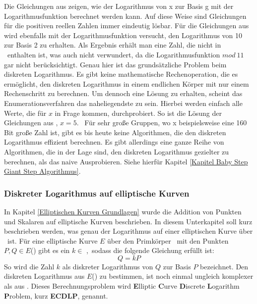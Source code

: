 		Die Gleichungen aus  zeigen, wie der Logarithmus von x zur Basis g mit der Logarithmusfunktion berechnet werden kann. Auf diese Weise sind Gleichungen für die positiven reellen Zahlen  immer eindeutig lösbar. Für die Gleichungen aus  wird ebenfalls mit der Logarithmusfunktion versucht, den Logarithmus von 10 zur Basis 2 zu erhalten. Als Ergebnis erhält man eine Zahl, die nicht in \myZPStern~enthalten ist, was auch nicht verwundert, da die Logarithmusfunktion $mod~11$ gar nicht berücksichtigt. Genau hier ist das grundsätzliche Problem beim diskreten Logarithmus. Es gibt keine mathematische Rechenoperation, die es ermöglicht, den diskreten Logarithmus in einem endlichen Körper mit nur einem Rechenschritt zu berechnen. Um dennoch eine Lösung zu erhalten, scheint das Enumerationsverfahren das naheliegendste zu sein. Hierbei werden einfach alle Werte, die für $x$ in Frage kommen, durchprobiert. So ist die Lösung der Gleichungen aus , $x = 5$.~\cite{DLP:ECDLP:Probleme:und:Loesungen} Für sehr große Gruppen, wo x beispielsweise eine 160 Bit große Zahl ist, gibt es bis heute keine Algorithmen, die den diskreten Logarithmus effizient berechnen.\cite{Kryptografie:in:Theorie:und:Praxis} Es gibt allerdings eine ganze Reihe von Algorithmen, die in der Lage sind, den diskreten Logarithmus gezielter zu berechnen, als das naive Ausprobieren. Siehe hierfür Kapitel   \ref{Kapitel Baby Step Giant Step Algorithmus}.
		
		
		\subsubsection{Diskreter Logarithmus auf elliptische Kurven}
			In Kapitel \ref{Elliptischen Kurven Grundlagen} wurde die Addition von Punkten und Skalaren auf elliptische Kurven beschrieben. In diesem Unterkapitel soll kurz beschrieben werden, was genau der Logarithmus auf einer elliptischen Kurve über \myZPStern~ist. Für eine elliptische Kurve $E$ über den Primkörper \myZPStern~mit den Punkten $P, Q \in E$(\myZPStern) gibt es ein $k \in$ \myZPStern,~sodass die folgende Gleichung erfüllt ist:
			\begin{displaymath}
			Q = kP
			\end{displaymath}
			So wird die Zahl $k$ als diskreter Logarithmus von $Q$ zur Basis $P$ bezeichnet. Den diskreten Logarithmus aus $E$(\myZPStern) zu bestimmen, ist noch einmal ungleich komplexer als aus \myZPStern. Dieses Berechnungsproblem wird \textbf{E}lliptic \textbf{C}urve \textbf{D}iscrete \textbf{L}ogarithm \textbf{P}roblem, kurz \textbf{ECDLP}, genannt.

